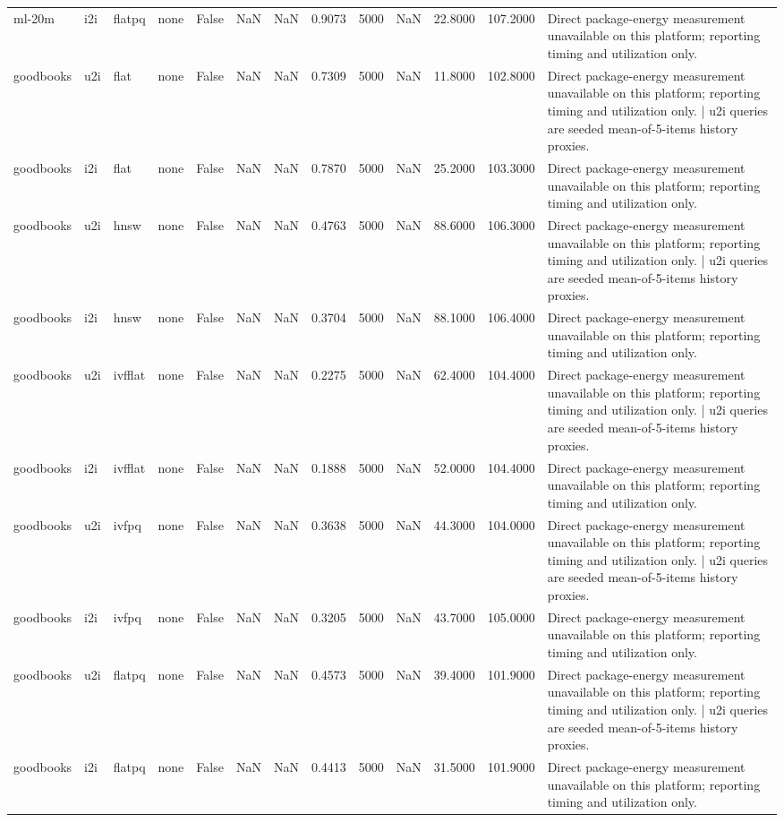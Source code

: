 \begin{tabular}{llllrrrrrrrrl}
ml-20m & i2i & flatpq & none & False & NaN & NaN & 0.9073 & 5000 & NaN & 22.8000 & 107.2000 & Direct package-energy measurement unavailable on this platform; reporting timing and utilization only. \\
goodbooks & u2i & flat & none & False & NaN & NaN & 0.7309 & 5000 & NaN & 11.8000 & 102.8000 & Direct package-energy measurement unavailable on this platform; reporting timing and utilization only. | u2i queries are seeded mean-of-5-items history proxies. \\
goodbooks & i2i & flat & none & False & NaN & NaN & 0.7870 & 5000 & NaN & 25.2000 & 103.3000 & Direct package-energy measurement unavailable on this platform; reporting timing and utilization only. \\
goodbooks & u2i & hnsw & none & False & NaN & NaN & 0.4763 & 5000 & NaN & 88.6000 & 106.3000 & Direct package-energy measurement unavailable on this platform; reporting timing and utilization only. | u2i queries are seeded mean-of-5-items history proxies. \\
goodbooks & i2i & hnsw & none & False & NaN & NaN & 0.3704 & 5000 & NaN & 88.1000 & 106.4000 & Direct package-energy measurement unavailable on this platform; reporting timing and utilization only. \\
goodbooks & u2i & ivfflat & none & False & NaN & NaN & 0.2275 & 5000 & NaN & 62.4000 & 104.4000 & Direct package-energy measurement unavailable on this platform; reporting timing and utilization only. | u2i queries are seeded mean-of-5-items history proxies. \\
goodbooks & i2i & ivfflat & none & False & NaN & NaN & 0.1888 & 5000 & NaN & 52.0000 & 104.4000 & Direct package-energy measurement unavailable on this platform; reporting timing and utilization only. \\
goodbooks & u2i & ivfpq & none & False & NaN & NaN & 0.3638 & 5000 & NaN & 44.3000 & 104.0000 & Direct package-energy measurement unavailable on this platform; reporting timing and utilization only. | u2i queries are seeded mean-of-5-items history proxies. \\
goodbooks & i2i & ivfpq & none & False & NaN & NaN & 0.3205 & 5000 & NaN & 43.7000 & 105.0000 & Direct package-energy measurement unavailable on this platform; reporting timing and utilization only. \\
goodbooks & u2i & flatpq & none & False & NaN & NaN & 0.4573 & 5000 & NaN & 39.4000 & 101.9000 & Direct package-energy measurement unavailable on this platform; reporting timing and utilization only. | u2i queries are seeded mean-of-5-items history proxies. \\
goodbooks & i2i & flatpq & none & False & NaN & NaN & 0.4413 & 5000 & NaN & 31.5000 & 101.9000 & Direct package-energy measurement unavailable on this platform; reporting timing and utilization only. \\
\bottomrule
\end{tabular}
